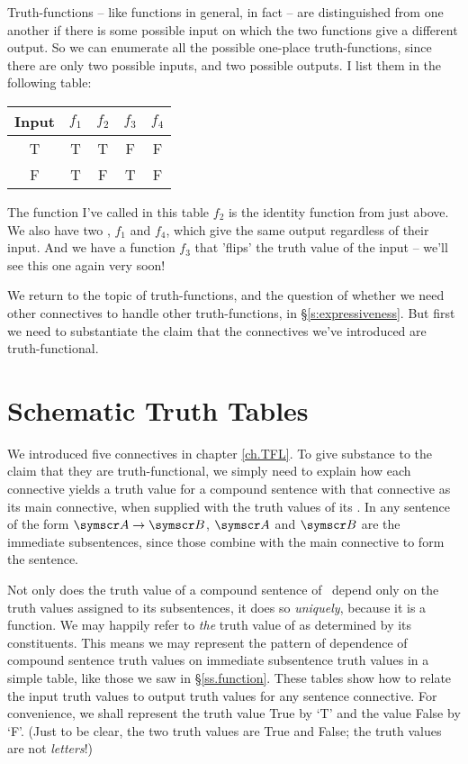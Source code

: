 Truth-functions – like functions in general, in fact – are distinguished from one another if there is some possible input on which the two functions give a different output. So we can enumerate all the possible one-place truth-functions, since there are only two possible inputs, and two possible outputs. I list them in the following table: 
\begin{center}
\begin{tabular}{c|cccc} \toprule 
Input & $f_{1}$ & $f_{2}$ & $f_{3}$ & $f_{4}$ \\
\midrule
T & T & T & F & F \\
F & T & F & T & F \\ \bottomrule
\end{tabular}
\end{center} The function I've called in this table $f_{2}$ is the identity function from just above. We also have two , $f_{1}$ and $f_{4}$, which give the same output regardless of their input. And we have a function $f_{3}$ that 'flips' the truth value of the input – we'll see this one again very soon!

We return to the topic of truth-functions, and the question of whether we need other connectives to handle other truth-functions, in §\ref{s:expressiveness}. But first we need to substantiate the claim that the connectives we've introduced are truth-functional.

\section{Schematic Truth Tables}\label{s:SchematicTruthTables}

We introduced five connectives in chapter \ref{ch.TFL}. To give substance to the claim that they are truth-functional, we simply need to explain how each connective yields a truth value for a compound sentence with that connective as its main connective, when supplied with the truth values of its . In any sentence of the form $\meta{A} \eif \meta{B}$, $\meta{A}$ and $\meta{B}$ are the immediate subsentences, since those combine with the main connective to form the sentence.

Not only does the truth value of a compound sentence of \TFL\ depend only on the truth values assigned to its subsentences, it does so \emph{uniquely}, because it is a function. We may happily refer to \emph{the} truth value of  as determined by its constituents. This means we may represent the pattern of dependence of compound sentence truth values on immediate subsentence truth values in a simple table, like those we saw in §\ref{ss.function}. These tables show how to relate the input truth values to output truth values for any sentence connective. For convenience, we shall represent the truth value True by `T' and the value False by `F'. (Just to be clear, the two truth values are True and False; the truth values are not \emph{letters}!) 

